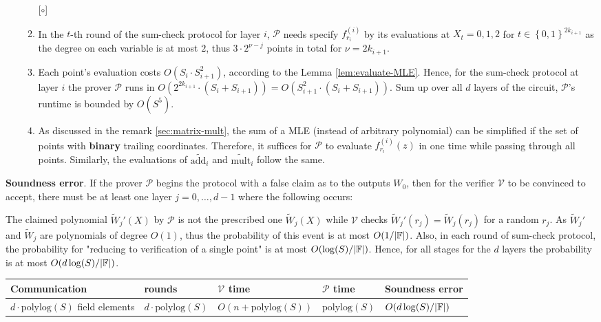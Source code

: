 \documentclass{article}
\begin{document}
\begin{itemize}
\begin{enumerate} [$\circ$]
\item\label{item:28} In the $t$-th round of the sum-check protocol for layer $i$, $\mathcal{P}$ needs specify $f_{r_i}^{(i)}$ by its evaluations at $X_{t} = 0, 1, 2$ for $t \in \left\{ 0, 1 \right\}^{2k_{i+1}}$ as the degree on each variable is at most $2$, thus $3 \cdot 2^{\nu - j}$ points in total for $\nu = 2k_{i+1}$. 
\item\label{item:29} Each point's evaluation costs $O(S_i \cdot S_{i+1}^{2})$, according to the Lemma \ref{lem:evaluate-MLE}. Hence, for the sum-check protocol at layer $i$ the prover $\mathcal{P}$ runs in $O(2^{2k_{i+1}} \cdot (S_i + S_{i+1})) = O(S_{i+1}^2 \cdot (S_i + S_{i+1}))$. Sum up over all $d$ layers of the circuit, $\mathcal{P}$'s runtime is bounded by $O(S^{5})$.  
\item\label{item:30} As discussed in the remark \ref{sec:matrix-mult}, the sum of a MLE (instead of arbitrary polynomial) can be simplified if the set of points with \textbf{binary} trailing coordinates. Therefore, it suffices for $\mathcal{P}$ to evaluate $f_{r_i}^{(i)}(z)$ in one time while passing through all points. Similarly, the evaluations of $ \widetilde{\text{add}_i}$ and $\widetilde{\text{mult}}_i$ follow the same. 
\end{enumerate}
\end{itemize}

\textbf{Soundness error}. If the prover $\mathcal{P}$ begins the protocol with a false claim as to the outputs $W_0$, then for the verifier $\mathcal{V}$ to be convinced to accept, there must be at least one layer $j = 0, \dots, d-1$ where the following occurs: 

The claimed polynomial $\widetilde{W}_j'(X)$ by $\mathcal{P}$ is not the prescribed one $\widetilde{W}_j(X)$ while $\mathcal{V}$ checks $\widetilde{W}_j'(r_j) = \widetilde{W}_j(r_j)$ for a random $r_j$. As $\widetilde{W}_j'$ and $\widetilde{W}_j$ are polynomials of degree $O(1)$, thus the probability of this event is at most $O(1/|\mathbb{F}|)$. Also, in each round of sum-check protocol, the probability for "reducing to verification of a single point" is at most $O(\log (S)/|\mathbb{F}|)$. Hence, for all stages for the $d$ layers the probability is at most $O(d \log (S)/|\mathbb{F}|)$.


\begin{center}
\begin{tabular} { | m{4cm} | m{2cm} | m{3cm} | m{2cm} | m{4cm} |}
\hline
Communication        & rounds   & $\mathcal{V}$ time  & $\mathcal{P}$ time  & Soundness error\\
\hline
$d \cdot \text{polylog}(S)$ field elements  & $d \cdot \text{polylog}(S) $  & $ O(n + \text{polylog}(S))$ & $\text{polylog}(S)$ & $O(d \log (S)/|\mathbb{F}|)$ \\
\hline
\end{tabular}
\end{center}
\end{document}
